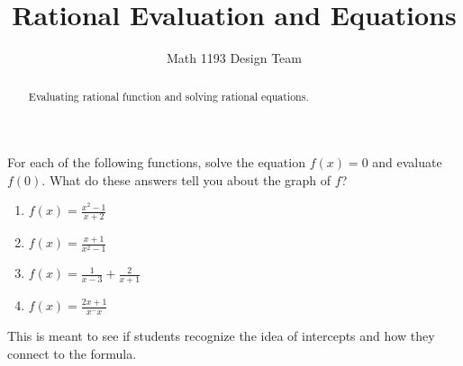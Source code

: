 \documentclass[noauthor]{ximera}
\title{Rational Evaluation and Equations}
\author{Math 1193 Design Team}
\begin{document}
\begin{abstract}
    Evaluating rational function and solving rational equations.
\end{abstract}
\maketitle

For each of the following functions, solve the equation \(f(x) = 0\)
and evaluate \(f(0)\). What do these answers tell you about the graph 
of \(f\)?

\begin{enumerate}
    \item \(f(x) = \frac{x^2 - 1}{x + 2}\)
    \item \(f(x) = \frac{x + 1}{x^2 - 1}\)
    \item \(f(x) = \frac{1}{x - 3} + \frac{2}{x + 1}\)
    \item \(f(x) = \frac{2x + 1}{x^ - x}\)
\end{enumerate}

\begin{instructorNotes}
This is meant to see if students recognize the idea of intercepts and how
they connect to the formula.
\end{instructorNotes}
\end{document}
